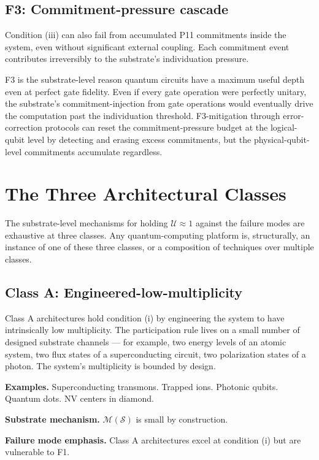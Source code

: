 \documentclass[11pt,a4paper]{article}
\begin{document}
\subsection{F3: Commitment-pressure cascade}

Condition (iii) can also fail from accumulated P11 commitments inside the system, even without significant external coupling. Each commitment event contributes irreversibly to the substrate's individuation pressure.

F3 is the substrate-level reason quantum circuits have a maximum useful depth even at perfect gate fidelity. Even if every gate operation were perfectly unitary, the substrate's commitment-injection from gate operations would eventually drive the computation past the individuation threshold. F3-mitigation through error-correction protocols can reset the commitment-pressure budget at the logical-qubit level by detecting and erasing excess commitments, but the physical-qubit-level commitments accumulate regardless.

\section{The Three Architectural Classes}

The substrate-level mechanisms for holding $\mathcal{U} \approx 1$ against the failure modes are exhaustive at three classes. Any quantum-computing platform is, structurally, an instance of one of these three classes, or a composition of techniques over multiple classes.

\subsection{Class A: Engineered-low-multiplicity}

Class A architectures hold condition (i) by engineering the system to have intrinsically low multiplicity. The participation rule lives on a small number of designed substrate channels --- for example, two energy levels of an atomic system, two flux states of a superconducting circuit, two polarization states of a photon. The system's multiplicity is bounded by design.

\textbf{Examples.} Superconducting transmons. Trapped ions. Photonic qubits. Quantum dots. NV centers in diamond.

\textbf{Substrate mechanism.} $\mathcal{M}(\mathcal{S})$ is small by construction.

\textbf{Failure mode emphasis.} Class A architectures excel at condition (i) but are vulnerable to F1.
\end{document}
